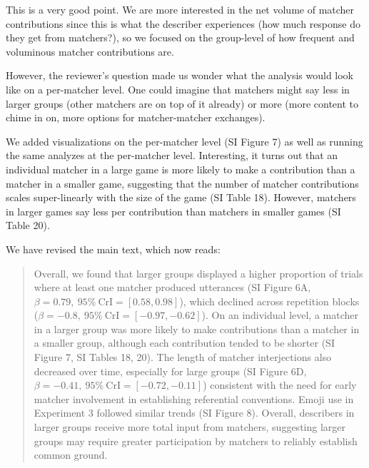 \documentclass{stanfordletter}
\newcommand{\revised}[1]{\begin{quote}	#1 \end{quote}}
\begin{document}
\begin{letter}{}
          
          This is a very good point. 
          We are more interested in the net volume of matcher contributions since this is what the describer experiences (how much response do they get from matchers?), so we focused on the group-level of how frequent and voluminous matcher contributions are. 
          
          However, the reviewer's question made us wonder what the analysis would look like on a per-matcher level. One could imagine that matchers might say less in larger groups (other matchers are on top of it already) or more (more content to chime in on, more options for matcher-matcher exchanges). 
          
          We added visualizations on the per-matcher level  (SI Figure 7) as well as running the same analyzes at the per-matcher level. Interesting, it turns out that an individual matcher in a large game is more likely to make a contribution than a matcher in a smaller game, suggesting that the number of matcher contributions scales super-linearly with the size of the game (SI Table 18). However, matchers in larger games say less per contribution than matchers in smaller games (SI Table 20). 
         
          We have revised the main text, which now reads:
          
          \revised{Overall, we found that larger groups displayed a higher proportion of trials where at least one matcher produced utterances (SI Figure 6A, \(\beta=0.79,\:95\%\:\mathrm{CrI}=[0.58, 0.98]\)), which declined across repetition blocks (\(\beta=-0.8,\:95\%\:\mathrm{CrI}=[-0.97, -0.62]\)). On an individual level, a matcher in a larger group was more likely to make contributions than a matcher in a smaller group, although each contribution tended to be shorter (SI Figure 7, SI Tables 18, 20).
          	The length of matcher interjections also decreased over time, especially for large groups (SI Figure 6D, \(\beta=-0.41,\:95\%\:\mathrm{CrI}=[-0.72, -0.11]\)) consistent with the need for early matcher involvement in establishing referential conventions.
          	Emoji use in Experiment 3 followed similar trends (SI Figure 8).
          	Overall, describers in larger groups receive more total input from matchers, suggesting larger groups may require greater participation by matchers to reliably establish common ground.}
         

\end{letter}
\end{document}
